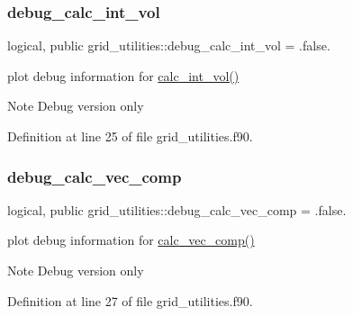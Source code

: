 \subsubsection{\texorpdfstring{debug\+\_\+calc\+\_\+int\+\_\+vol}{debug\_calc\_int\_vol}}
{\footnotesize\ttfamily logical, public grid\+\_\+utilities\+::debug\+\_\+calc\+\_\+int\+\_\+vol = .false.}



plot debug information for \hyperlink{namespacegrid__utilities_a97e3106dbdc10b726af74afa113ba533}{calc\+\_\+int\+\_\+vol()} 

\begin{DoxyNote}{Note}
Debug version only 
\end{DoxyNote}


Definition at line 25 of file grid\+\_\+utilities.\+f90.

\mbox{\label{namespacegrid__utilities_ab420036236dc8a9a69e180550499d95b}} 
\subsubsection{\texorpdfstring{debug\+\_\+calc\+\_\+vec\+\_\+comp}{debug\_calc\_vec\_comp}}
{\footnotesize\ttfamily logical, public grid\+\_\+utilities\+::debug\+\_\+calc\+\_\+vec\+\_\+comp = .false.}



plot debug information for \hyperlink{namespacegrid__utilities_ad3d9386b9abcb1a7e17369a1b3a3750d}{calc\+\_\+vec\+\_\+comp()} 

\begin{DoxyNote}{Note}
Debug version only 
\end{DoxyNote}


Definition at line 27 of file grid\+\_\+utilities.\+f90.

